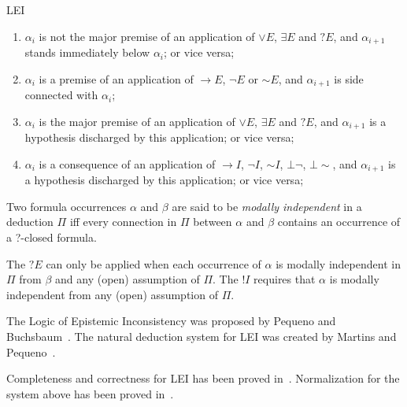\begin{entry}{LEI}
\begin{clarifications}
  \begin{enumerate}
  
  \item
   $\alpha_{i}$ is not the major premise of an application of $\vee E$, 
  $\exists E$ and
  $?E$, and $\alpha_{i+1}$ stands immediately below $\alpha_{i}$; or vice 
  versa;
  
  \item 
  $\alpha_{i}$ is a premise of an application of $\rightarrow E$, $\neg E$ or
  $\sim E$, and $\alpha_{i+1}$ is side connected with  $\alpha_{i}$;
  
  \item 
  $\alpha_{i}$ is  the major premise of an application of $\vee E$, $\exists E$ and
  $?E$, and $\alpha_{i+1}$ is a hypothesis discharged by this application;  or 
  vice versa;
  
  \item 
  $\alpha_{i}$ is a consequence of an application of $\rightarrow I$, 
  $\neg I$, $\sim I$,
  $\bot\neg$, $\bot\!\!\sim$, and $\alpha_{i+1}$ is a hypothesis discharged by 
  this application;
   or vice versa;
  \end{enumerate}

  Two formula occurrences $\alpha$ and $\beta$  are said to be \emph{modally
  independent} in a deduction $\Pi$ iff every connection in $\Pi$ between $\alpha$
  and $\beta$ contains an occurrence of a ?-closed formula.
  
  The $?E$ can only be applied when each occurrence of $\alpha$ is modally
  independent in $\Pi$ from $\beta$ and any (open) assumption of $\Pi$. The $!I$
  requires that $\alpha$ is modally independent from any (open) assumption of
  $\Pi$.
\end{clarifications}

\begin{history}
  The Logic of Epistemic Inconsistency was proposed by Pequeno and
  Buchsbaum~\cite{pequeno1991}. The natural deduction system for LEI was created
  by Martins and Pequeno~\cite{martins1993}.
\end{history}

\begin{technicalities}
  Completeness and correctness for LEI has been proved in~\cite{martins1997}.
  Normalization for the system above has been proved in~\cite{martins2007}.
\end{technicalities}

\end{entry}
